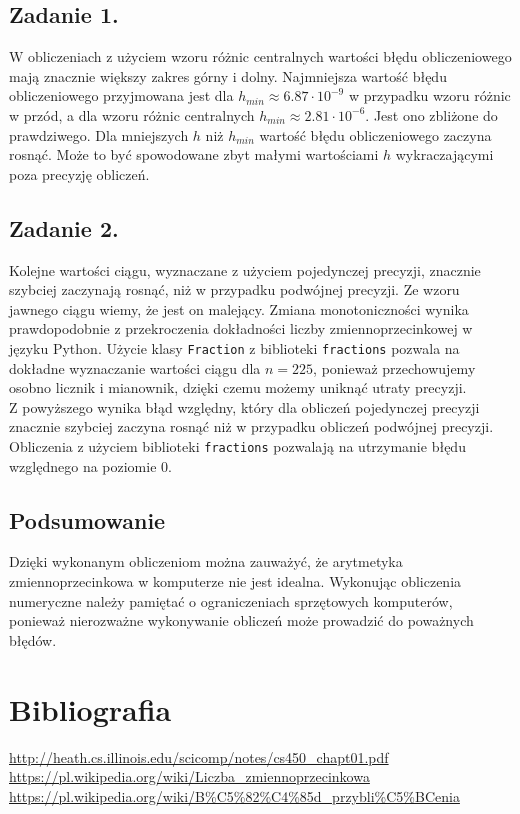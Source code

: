 \documentclass[11pt]{scrartcl}
\begin{document}
    \subsection{Zadanie 1.}
    W obliczeniach z użyciem wzoru różnic centralnych wartości błędu
    obliczeniowego mają znacznie większy zakres górny i dolny. Najmniejsza
    wartość błędu obliczeniowego przyjmowana jest dla
    $h_{min} \approx 6.87 \cdot 10^{-9}$ w przypadku wzoru różnic w przód, a dla
    wzoru różnic centralnych $h_{min} \approx 2.81 \cdot 10^{-6}$. Jest ono
    zbliżone do prawdziwego. Dla mniejszych $h$ niż $h_{min}$ wartość błędu
    obliczeniowego zaczyna rosnąć. Może to być spowodowane zbyt małymi
    wartościami $h$ wykraczającymi poza precyzję obliczeń.

    \subsection{Zadanie 2.}
    Kolejne wartości ciągu, wyznaczane z użyciem pojedynczej precyzji, znacznie
    szybciej zaczynają rosnąć, niż w przypadku podwójnej precyzji. Ze wzoru
    jawnego ciągu wiemy, że jest on malejący. Zmiana monotoniczności wynika
    prawdopodobnie z przekroczenia dokładności liczby zmiennoprzecinkowej
    w języku Python. Użycie klasy \texttt{Fraction} z biblioteki \texttt{fractions}
    pozwala na dokładne wyznaczanie wartości ciągu dla $n=225$, ponieważ
    przechowujemy osobno licznik i mianownik, dzięki czemu możemy uniknąć
    utraty precyzji. \\
    Z powyższego wynika błąd względny, który dla obliczeń pojedynczej precyzji
    znacznie szybciej zaczyna rosnąć niż w przypadku obliczeń podwójnej precyzji.
    Obliczenia z użyciem biblioteki \texttt{fractions} pozwalają na utrzymanie
    błędu względnego na poziomie $0$.

    \subsection{Podsumowanie}
    Dzięki wykonanym obliczeniom można zauważyć, że arytmetyka zmiennoprzecinkowa
    w komputerze nie jest idealna. Wykonując obliczenia numeryczne należy pamiętać
    o ograniczeniach sprzętowych komputerów, ponieważ nierozważne wykonywanie
    obliczeń może prowadzić do poważnych błędów.

    \section{Bibliografia}
    \url{http://heath.cs.illinois.edu/scicomp/notes/cs450_chapt01.pdf} \\
    \url{https://pl.wikipedia.org/wiki/Liczba_zmiennoprzecinkowa} \\
    \url{https://pl.wikipedia.org/wiki/B%C5%82%C4%85d_przybli%C5%BCenia}
\end{document}
